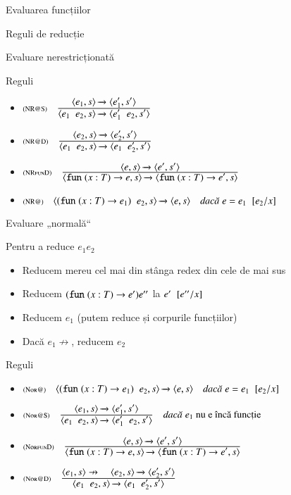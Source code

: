\documentclass[xcolor=pdftex,romanian,colorlinks]{beamer}
\begin{document}
\begin{section}{Evaluarea funcțiilor}
\begin{subsection}{Reguli de reducție}
\begin{frame}{Evaluare nerestricționată}
\begin{block}{Reguli}
\begin{itemize}
\item[]$\reg[NR@S]{\Ss{\c{e_1\mathrel{}e_2,s}}{\c{e_1'\mathrel{}e_2,s'}}}{\Ss{\c{e_1,s}}{\c{e_1',s'}}}{}$
\item[]$\reg[NR@D]{\Ss{\c{e_1\mathrel{}e_2,s}}{\c{e_1\mathrel{}e_2',s'}}}{\Ss{\c{e_2,s}}{\c{e_2',s'}}}{}$
\item[]$\reg[NRfunD]{\Ss{\c{\Sfun (x:T) \rightarrow e,s}}{\c{\Sfun (x:T) \rightarrow e',s}}}{\Ss{\c{e,s}}{\c{e',s'}}}{}$
\item[]$\reg[NR@]{\Ss{\c{(\Sfun (x:T) \rightarrow e_1)\mathrel{}e_2,s}}{\c{e,s}}}{}{e = \substapp{e_1}{\subst{\substpair{e_2}{x}}}}$
\end{itemize}
\end{block}
\end{frame}

\begin{frame}{Evaluare „normală“}
\begin{block}{}
Pentru a reduce $e_1 \mathrel{} e_2$
\begin{itemize}
\item Reducem mereu cel mai din stânga redex din cele de mai sus
\item Reducem $(\mathrel{\text{\ttfamily fun}} (x : T) \rightarrow e') e''$ la $e'\mathrel{}[e''/x]$
\item Reducem $e_1$ (putem reduce și corpurile funcțiilor)
\item Dacă $e_1\not\rightarrow$, reducem $e_2$
\end{itemize} 
\end{block}

\begin{block}{Reguli}
\begin{itemize}
\item[]$\reg[Nor@]{\Ss{\c{(\Sfun (x:T) \rightarrow e_1)\mathrel{}e_2,s}}{\c{e,s}}}{}{e = \substapp{e_1}{\subst{\substpair{e_2}{x}}}}$
\item[]$\reg[Nor@S]{\Ss{\c{e_1\mathrel{}e_2,s}}{\c{e_1'\mathrel{}e_2,s'}}}{\Ss{\c{e_1,s}}{\c{e_1',s'}}}{e_1 \mbox{ nu e încă funcție}}$
\item[]$\reg[NorfunD]{\Ss{\c{\Sfun (x:T) \rightarrow e,s}}{\c{\Sfun (x:T) \rightarrow e',s}}}{\Ss{\c{e,s}}{\c{e',s'}}}{}$
\item[]$\reg[Nor@D]{\Ss{\c{e_1\mathrel{}e_2,s}}{\c{e_1\mathrel{}e_2',s'}}}{\displaystyle \c{e_1,s}\not\rightarrow \si \Ss{\c{e_2,s}}{\c{e_2',s'}}}{}$
\end{itemize}
\end{block}
\end{frame}



\end{subsection}
\end{section}
\end{document}
